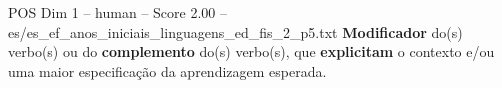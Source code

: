 \begin{textsample}{POS Dim 1 – human – Score 2.00 – es/es\_ef\_anos\_iniciais\_linguagens\_ed\_fis\_2\_p5.txt}  \label{ex:f1_pos_002}
\textbf{Modificador} do(s) verbo(s) ou do \textbf{complemento} do(s) verbo(s), que \textbf{explicitam} o contexto e/ou uma maior especificação da aprendizagem esperada.

\end{textsample}
